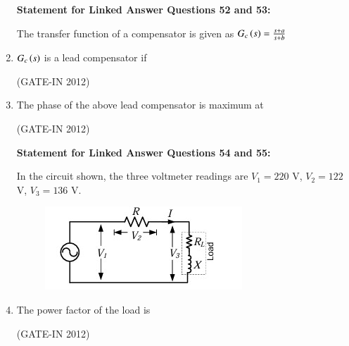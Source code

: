 \documentclass[journal,12pt,onecolumn]{IEEEtran}
\theoremstyle{remark}
\begin{document}
\begin{enumerate}
\textbf{Statement for Linked Answer Questions 52 and 53:}

The transfer function of a compensator is given as $G_c\left(s\right) = \frac{s+a}{s+b}$

\item $G_c\left(s\right)$ is a lead compensator if

\hfill{(GATE-IN 2012)}
\begin{enumerate}
\end{enumerate}

\item The phase of the above lead compensator is maximum at

\hfill{(GATE-IN 2012)}
\begin{enumerate}
\end{enumerate}

\textbf{Statement for Linked Answer Questions 54 and 55:}

In the circuit shown, the three voltmeter readings are $V_1 = 220$ V, $V_2 = 122$ V, $V_3 = 136$ V.

\begin{figure}[H]
    \centering
    \includegraphics[width=0.4\columnwidth]{figs/a24.jpg}
    \caption*{}
    \label{fig:a24}
\end{figure}

\item The power factor of the load is

\hfill{(GATE-IN 2012)}
\begin{enumerate}
\end{enumerate}


\end{enumerate}
\end{document}
